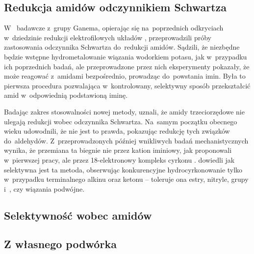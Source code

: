 \subsection{Redukcja amidów odczynnikiem Schwartza}\label{literature:schwartz:amides}
W~\citeyear{schedler93} badawcze z~grupy Ganema, opierając się na~poprzednich
  odkryciach w~dziedzinie redukcji elektrofilowych układów \textpi{},
  przeprowadzili próby zastosowania odczynnika Schwartza do~redukcji amidów.
Sądzili, że niezbędne będzie wstępne hydrometalowanie wiązania  wodorkiem potasu,
  jak w~przypadku ich poprzednich badań,
  ale przeprowadzone przez nich eksperymenty pokazały, że \schwartz{} może reagować z~amidami
  bezpośrednio, prowadząc do~powstania imin.
Była to pierwsza procedura pozwalająca w~kontrolowany, selektywny sposób przekształcić
  amid w~odpowiednią \iupac{\N-}podstawioną iminę.

Badając zakres stosowalności nowej metody, \citeauthor{schedler93} uznali, że amidy trzeciorzędowe
  nie ulegają redukcji wobec odczynnika Schwartza.
Na~samym początku obecnego wieku \citeauthor{white00} udowodnili, że nie jest to prawda,
  pokazując redukcję tych związków do~aldehydów.
Z~przeprowadzonych później wnikliwych badań mechanistycznych wynika, że przemiana ta biegnie nie przez kation iminiowy, jak proponowali w~pierwszej pracy,
  ale przez 18-elektronowy kompleks cyrkonu .
\citeauthor{spletstoser07} dowiedli jak selektywna jest ta metoda, obserwując konkurencyjne
  hydrocyrkonowanie tylko w~przypadku terminalnego alkinu oraz ketonu \---
  toleruje ona estry, nitryle, grupy  i~, czy wiązania podwójne.

\subsection{Selektywność wobec amidów}\label{literature:schwartz:selecivity}
\subsection{Z własnego podwórka}\label{literature:schwartz:our}

